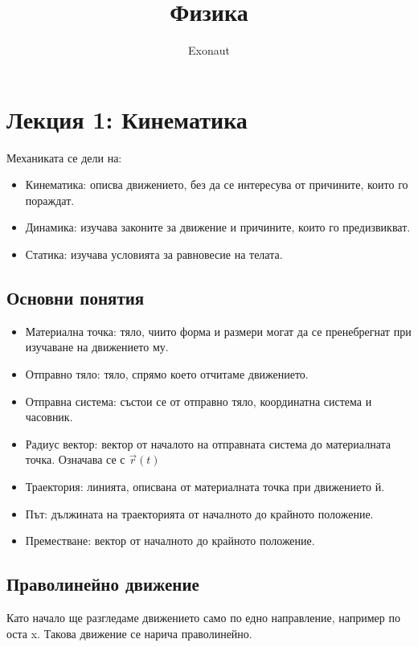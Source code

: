\documentclass[fleqn, 12pt]{article}
\title{Физика}
\author{Exonaut}
\theoremstyle{definition}
\begin{document}
\maketitle
{}
\newpage
{}

\tableofcontents
\newpage

\section{Лекция 1: Кинематика}
Механиката се дели на: 
\begin{itemize}
	\item Кинематика: описва движението, без да се интересува от причините, които го пораждат.
	\item Динамика: изучава законите за движение и причините, които го предизвикват.
	\item Статика: изучава условията за равновесие на телата.
\end{itemize}

\subsection{Основни понятия}

\begin{itemize}
	\item Материална точка: тяло, чиито форма и размери могат да се пренебрегнат при изучаване на движението му.
	\item Отправно тяло: тяло, спрямо което отчитаме движението.
	\item Отправна система: състои се от отправно тяло, координатна система и часовник.
	\item Радиус вектор: вектор от началото на отправната система до материалната точка. Означава се с $\vec{r}(t)$
	\item Траектория: линията, описвана от материалната точка при движението й.
	\item Път: дължината на траекторията от началното до крайното положение.
	\item Преместване: вектор от началното до крайното положение.
\end{itemize}

\subsection{Праволинейно движение}
Като начало ще разгледаме движението само по едно направление, например по оста x. Такова движение се нарича праволинейно.
\end{document}
